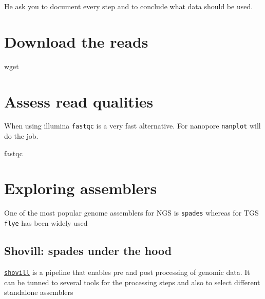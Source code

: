 \documentclass[
  letterpaper,
]{scrbook}
\newenvironment{Shaded}{\begin{snugshade}}{\end{snugshade}}
\newcommand{\ExtensionTok}[1]{\textcolor[rgb]{0.00,0.46,0.62}{#1}}
\newcommand{\FunctionTok}[1]{\textcolor[rgb]{0.28,0.35,0.67}{#1}}
\begin{document}
He ask you to document every step and to conclude what data should be
used.

\hypertarget{download-the-reads}{%
\section*{Download the reads}\label{download-the-reads}}

\hypertarget{downloading-seqs}{%
\label{downloading-seqs}}%
\begin{Shaded}
\begin{Highlighting}[]
\FunctionTok{wget}
\end{Highlighting}
\end{Shaded}

\hypertarget{assess-read-qualities}{%
\section*{Assess read qualities}\label{assess-read-qualities}}

When using illumina \texttt{fastqc} is a very fast alternative. For
nanopore \texttt{nanplot} will do the job.

\begin{Shaded}
\begin{Highlighting}[]
\ExtensionTok{fastqc}
\end{Highlighting}
\end{Shaded}

\hypertarget{exploring-assemblers}{%
\section*{Exploring assemblers}\label{exploring-assemblers}}

One of the most popular genome assemblers for NGS is \texttt{spades}
whereas for TGS \texttt{flye} has been widely used

\hypertarget{shovill-spades-under-the-hood}{%
\subsection*{Shovill: spades under the
hood}\label{shovill-spades-under-the-hood}}

\href{https://github.com/tseemann/shovill}{\texttt{shovill}} is a
pipeline that enables pre and post processing of genomic data. It can be
tunned to several tools for the processing steps and also to select
different standalone assemblers
\end{document}
